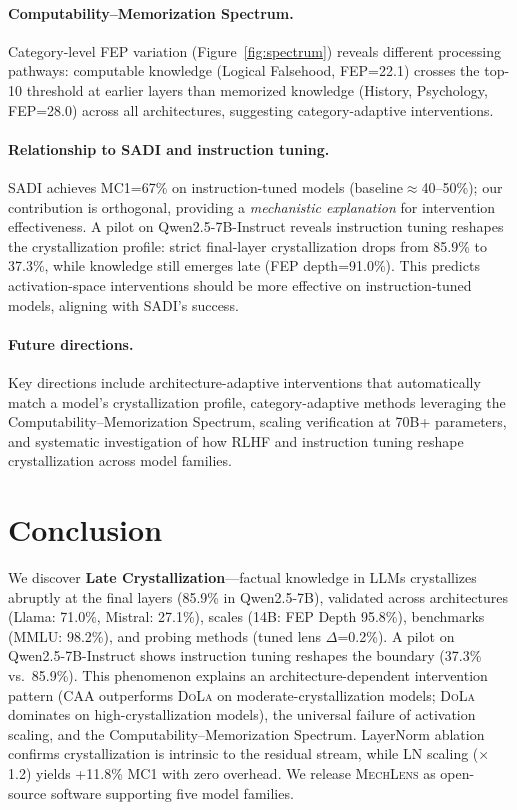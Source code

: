 \documentclass{article}
\newcommand{\mechlens}{\textsc{MechLens}}
\newcommand{\dola}{\textsc{DoLa}}
\newcommand{\caa}{\textsc{CAA}}
\begin{document}
\paragraph{Computability--Memorization Spectrum.} Category-level FEP variation (Figure~\ref{fig:spectrum}) reveals different processing pathways: computable knowledge (Logical Falsehood, FEP=22.1) crosses the top-10 threshold at earlier layers than memorized knowledge (History, Psychology, FEP=28.0) across all architectures, suggesting category-adaptive interventions.

\paragraph{Relationship to SADI and instruction tuning.} SADI \citep{zhang2025sadi} achieves MC1=67\% on instruction-tuned models (baseline$\approx$40--50\%); our contribution is orthogonal, providing a \emph{mechanistic explanation} for intervention effectiveness. A pilot on Qwen2.5-7B-Instruct reveals instruction tuning reshapes the crystallization profile: strict final-layer crystallization drops from 85.9\% to 37.3\%, while knowledge still emerges late (FEP depth=91.0\%). This predicts activation-space interventions should be more effective on instruction-tuned models, aligning with SADI's success.

\paragraph{Future directions.} Key directions include architecture-adaptive interventions that automatically match a model's crystallization profile, category-adaptive methods leveraging the Computability--Memorization Spectrum, scaling verification at 70B+ parameters, and systematic investigation of how RLHF and instruction tuning reshape crystallization across model families.

\section{Conclusion}

We discover \textbf{Late Crystallization}---factual knowledge in LLMs crystallizes abruptly at the final layers (85.9\% in Qwen2.5-7B), validated across architectures (Llama: 71.0\%, Mistral: 27.1\%), scales (14B: FEP Depth 95.8\%), benchmarks (MMLU: 98.2\%), and probing methods (tuned lens $\Delta$=0.2\%). A pilot on Qwen2.5-7B-Instruct shows instruction tuning reshapes the boundary (37.3\% vs.\ 85.9\%). This phenomenon explains an architecture-dependent intervention pattern (\caa{} outperforms \dola{} on moderate-crystallization models; \dola{} dominates on high-crystallization models), the universal failure of activation scaling, and the Computability--Memorization Spectrum. LayerNorm ablation confirms crystallization is intrinsic to the residual stream, while LN scaling ($\times$1.2) yields +11.8\% MC1 with zero overhead. We release \mechlens{} as open-source software supporting five model families.
\end{document}
